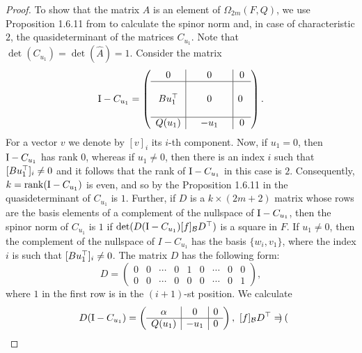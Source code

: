 \begin{proof}
    To show that the matrix $A$ is an element of $\Omega_{2m}(F,Q)$,
    we use Proposition 1.6.11 from \cite{BrayHoltRD} to calculate the spinor 
    norm and, in case of characteristic $2$, the quasideterminant of the
    matrices $C_{u_1}$. Note that $\det(C_{u_1}) = \det(\hat{A}) = 1$.
    Consider the matrix
    \begin{equation*}
	\mathord{\mathrm{I}}-C_{u_1} = \left(
	    \begin{array}{c|c|c}
		0 & 0 & 0  \\ \hline 
		 & & \\
		Bu_1^\top &\ \ \ \ \ 0\ \ \ \ \  & 0\  \\ 
		 & & \\ \hline 
		Q(u_1) & -u_1 & 0
	    \end{array}
	\right).
    \end{equation*}
    For a vector $v$ we denote by $[v]_i$ its $i$-th component. Now, 
    if $u_1 = 0$, then $\mathord{\mathrm{I}}-C_{u_1}$ has rank $0$, whereas if $u_1 \neq 0$, then
    there is an index $i$ such that $[Bu_1^\top]_i \neq 0$ and it follows that
    the rank of $\mathord{\mathrm{I}}-C_{u_1}$ in this case is $2$. Consequently, $k=\operatorname{rank}(\mathord{\mathrm{I}}-C_{u_1})$ is
    even, and so by the Proposition 1.6.11 in \cite{BrayHoltRD} the quasideterminant of $C_{u_1}$
    is $1$. Further, if $D$ is a $k\times (2m+2)$ matrix whose rows are the basis
    elements of a complement of the nullspace of $\mathord{\mathrm{I}}-C_{u_1}$, then the spinor norm of
     $C_{u_1}$ is $1$
    if $\det(D(\mathord{\mathrm{I}}-C_{u_1}) [f]_{\mathcal{B}} D^\top)$ is a square in $F$. If $u_1 \neq 0$,
    then the complement of the nullspace of $I-C_{u_1}$ has the basis
    $\{ w_i, v_1 \}$, where the index $i$ is such that $[Bu_1^\top]_i \neq 0$. 
    The matrix $D$ has the following form:
    \begin{equation*}
	D = \begin{pmatrix}
	    0 & 0 & \cdots & 0 & 1 & 0 & \cdots & 0 & 0 \\
	    0 & 0 & \cdots & 0 & 0 & 0 & \cdots & 0 & 1
	\end{pmatrix},
    \end{equation*}
    where $1$ in the first row is in the $(i+1)$-st position. We calculate
    \begin{equation*}
	D(\II-C_{u_1}) = \left(
	    \begin{array}{c|c|c}
		\alpha & 0 & 0 \\ \hline
		Q(u_1) & -u_1 & 0
	    \end{array}
	\right),\ 
	[f]_{\mathcal{B}} D^\T = \begin{pmatrix}

\end{pmatrix}
\end{equation*}
\end{proof}
